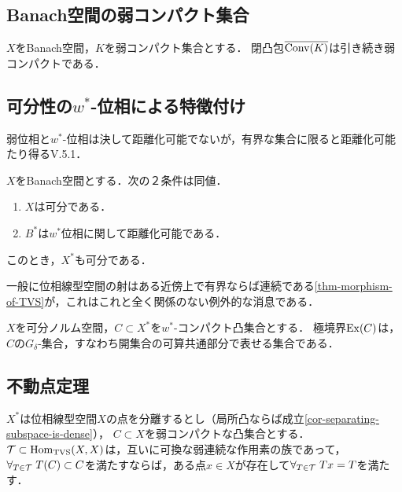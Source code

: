 \documentclass[uplatex,dvipdfmx]{jsreport}
\begin{document}
\subsection{Banach空間の弱コンパクト集合}

\begin{theorem}
    $X$をBanach空間，$K$を弱コンパクト集合とする．
    閉凸包$\overline{\mathrm{Conv}(K)}$は引き続き弱コンパクトである．
\end{theorem}

\subsection{可分性の$w^*$-位相による特徴付け}

\begin{tcolorbox}[colframe=ForestGreen, colback=ForestGreen!10!white,breakable,colbacktitle=ForestGreen!40!white,coltitle=black,fonttitle=\bfseries\sffamily,
title=]
    弱位相と$w^*$-位相は決して距離化可能でないが，有界な集合に限ると距離化可能たり得る\cite{John Conway}V.5.1．
\end{tcolorbox}

\begin{theorem}[単位閉球の距離化可能性]\label{thm-metrizability-of-ball}
    $X$をBanach空間とする．次の２条件は同値．
    \begin{enumerate}
        \item $X$は可分である．
        \item $B^*$は$w^*$位相に関して距離化可能である．
    \end{enumerate}
    このとき，$X^*$も可分である．
\end{theorem}
\begin{remarks}
    一般に位相線型空間の射はある近傍上で有界ならば連続である\ref{thm-morphism-of-TVS}が，これはこれと全く関係のない例外的な消息である．
\end{remarks}

\begin{proposition}
    $X$を可分ノルム空間，$C\subset X^*$を$w^*$-コンパクト凸集合とする．
    極境界$\mathrm{Ex}(C)$は，$C$の$G_\delta$-集合，すなわち開集合の可算共通部分で表せる集合である．
\end{proposition}

\subsection{不動点定理}

\begin{theorem}
    $X^*$は位相線型空間$X$の点を分離するとし（局所凸ならば成立\ref{cor-separating-subspace-is-dense}），
    $C\subset X$を弱コンパクトな凸集合とする．$\mathcal{T}\subset\mathrm{Hom}_{\mathrm{TVS}}(X,X)$は，互いに可換な弱連続な作用素の族であって，$\forall_{T\in\mathcal{T}}\;T(C)\subset C$を満たすならば，ある点$x\in X$が存在して$\forall_{T\in\mathcal{T}}\;Tx=T$を満たす．
\end{theorem}
\end{document}
